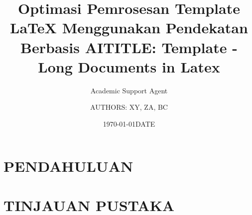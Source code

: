 \documentclass{article}
\title{Optimasi Pemrosesan Template LaTeX Menggunakan Pendekatan Berbasis AI}
\author{Academic Support Agent}
\date{\today}
\begin{document}
\maketitle

\begin{abstract}

\end{abstract}

\chapter{PENDAHULUAN}


\chapter{TINJAUAN PUSTAKA}


\title{TITLE: Template - Long Documents in Latex}
\author{AUTHORS: XY, ZA, BC}
\date{DATE}

\usepackage[toc,page]{appendix}
\usepackage[toc,acronym]{glossaries}

\usepackage{lipsum}  
\usepackage[switch]{lineno}
\usepackage{subfiles}
\usepackage{draftwatermark}
\makeglossaries
\newcommand{\note}[1]{{\bf (Note: \color{blue} #1})}
\def\linenumberfont{\normalfont\small\sffamily}

\end{document}
